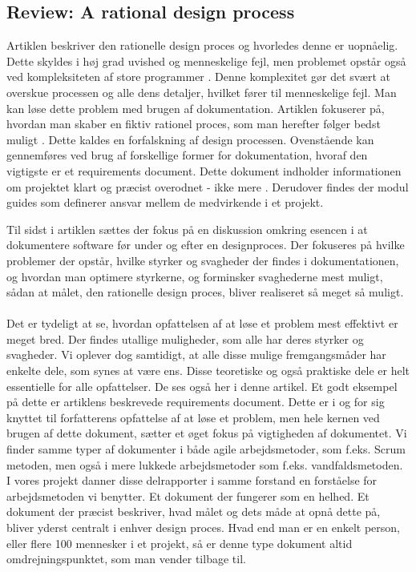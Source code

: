\documentclass[a4paper,12pt]{article}
\begin{document}
\subsection{Review: A rational design process}
Artiklen beskriver den rationelle design proces og hvorledes denne er uopnåelig. Dette skyldes i høj grad uvished og menneskelige fejl, men problemet opstår også ved kompleksiteten af store programmer \cite[side~251]{ardp}. Denne komplexitet gør det svært at overskue processen og alle dens detaljer, hvilket fører til menneskelige fejl. Man kan løse dette problem med brugen af dokumentation.
Artiklen fokuserer på, hvordan man skaber en fiktiv rationel proces, som man herefter følger bedst muligt \cite[side~252]{ardp}.
Dette kaldes en forfalskning af design processen.
Ovenstående kan gennemføres ved brug af forskellige former for dokumentation, hvoraf den vigtigste er et
requirements document. Dette dokument indholder informationen om projektet klart og præcist overodnet - ikke mere \cite[side~252-253]{ardp}.
Derudover findes der modul guides som definerer ansvar mellem de medvirkende i et projekt.

Til sidst i artiklen sættes der fokus på en diskussion omkring esencen i at dokumentere software før under og efter en designproces. Der fokuseres på hvilke problemer der opstår, hvilke styrker og svagheder der findes i dokumentationen, og hvordan man optimere styrkerne, og forminsker svaghederne mest muligt, sådan at målet, den rationelle design proces, bliver realiseret så meget så muligt\cite[side~255]{ardp}.
\\
\\
Det er tydeligt at se, hvordan opfattelsen af at løse et problem mest effektivt er meget bred. Der findes utallige muligheder, som alle har deres styrker og svagheder. Vi oplever dog samtidigt, at alle disse mulige fremgangsmåder har enkelte dele, som synes at være ens. Disse teoretiske og også praktiske dele er helt essentielle for alle opfattelser. De ses også her i denne artikel. Et godt eksempel på dette er artiklens beskrevede requirements document. Dette er i og for sig knyttet til forfatterens opfattelse af at løse et problem, men hele kernen ved brugen af dette dokument, sætter et øget fokus på vigtigheden af dokumentet. Vi finder samme typer af dokumenter i både agile arbejdsmetoder, som f.eks. Scrum metoden, men også i mere lukkede arbejdsmetoder som f.eks. vandfaldsmetoden. I vores projekt danner disse delrapporter i samme forstand en forståelse for arbejdsmetoden vi benytter. Et dokument der fungerer som en helhed. Et dokument der præcist beskriver, hvad målet og dets måde at opnå dette på, bliver yderst centralt i enhver design proces. Hvad end man er en enkelt person, eller flere 100 mennesker i et projekt, så er denne type dokument altid omdrejningspunktet, som man vender tilbage til.
\end{document}
